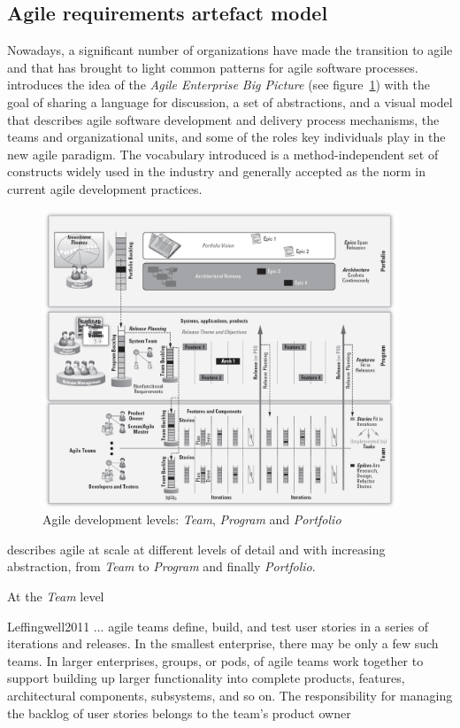 \documentclass[dissertation,final]{softeng}
\begin{document}
\subsection{Agile requirements artefact model}
Nowadays, a significant number of organizations have made the transition to agile and that has brought to light common patterns for agile software processes. ~\citet{Leffingwell2011} introduces the idea of the \emph{Agile Enterprise Big Picture} (see figure~\ref{fig:scaled_agile_framework}) with the goal of sharing a language for discussion, a set of abstractions, and a visual model that describes agile software development and delivery process mechanisms, the teams and organizational units, and some of the roles key individuals play in the new agile paradigm. The vocabulary introduced is a method-independent set of constructs widely used in the industry and generally accepted as the norm in current agile development practices.

\begin{figure}[h]
\includegraphics[width=0.95\textwidth]{ScaledAgileFrameworkbw}
\centering
\caption[Agile enterprise]{Agile development levels: \emph{Team}, \emph{Program} and \emph{Portfolio}~\citep{Leffingwell2011}}
\label{fig:scaled_agile_framework}
\end{figure}

\citeauthor{Leffingwell2011} describes agile at scale at different levels of detail and with increasing abstraction, from \emph{Team} to \emph{Program} and finally \emph{Portfolio}. 

At the \emph{Team} level
\begin{displaycquote}{Leffingwell2011}
... agile teams define, build, and test user stories in a series of iterations and releases. In the smallest enterprise, there may be only a few such teams. In larger enterprises, groups, or pods, of agile teams work together to support building up larger functionality into complete products, features, architectural components, subsystems, and so on. The responsibility for managing the backlog of user stories belongs to the team's product owner
\end{displaycquote}
\end{document}
